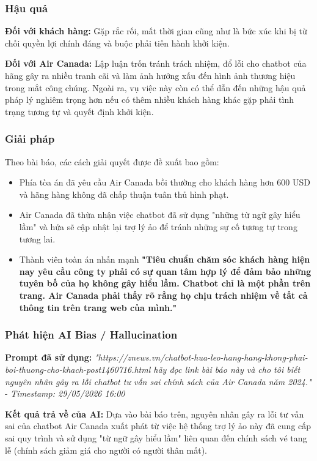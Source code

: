 \subsubsection{Hậu quả}
\textbf{Đối với khách hàng:} Gặp rắc rối, mất thời gian cũng như là bức xúc khi bị từ chối quyền lợi chính đáng và buộc phải tiến hành khởi kiện.

\textbf{Đối với Air Canada:} Lập luận trốn tránh trách nhiệm, đổ lỗi cho chatbot của hãng gây ra nhiều tranh cãi và làm ảnh hưởng xấu đến hình ảnh thương hiệu trong mắt công chúng. Ngoài ra, vụ việc này còn có thể dẫn đến những hậu quả pháp lý nghiêm trọng hơn nếu có thêm nhiều khách hàng khác gặp phải tình trạng tương tự và quyết định khởi kiện.

\subsubsection{Giải pháp}
Theo bài báo, các cách giải quyết được đề xuất bao gồm:

\begin{itemize}
    \item Phía tòa án đã yêu cầu Air Canada bồi thường cho khách hàng hơn 600 USD và hãng hàng không đã chấp thuận tuân thủ hình phạt.
    \item Air Canada đã thừa nhận việc chatbot đã sử dụng "những từ ngữ gây hiểu lầm" và hứa sẽ cập nhật lại trợ lý ảo để tránh những sự cố tương tự trong tương lai.
    \item Thành viên toàn án nhấn mạnh \textbf{"Tiêu chuẩn chăm sóc khách hàng hiện nay yêu cầu công ty phải có sự quan tâm hợp lý để đảm bảo những tuyên bố của họ không gây hiểu lầm. Chatbot chỉ là một phần trên trang. Air Canada phải thấy rõ rằng họ chịu trách nhiệm về tất cả thông tin trên trang web của mình."}
\end{itemize}

\subsubsection{Phát hiện AI Bias / Hallucination}
\textbf{Prompt đã sử dụng:} \textit{"{https://znews.vn/chatbot-hua-leo-hang-hang-khong-phai-boi-thuong-cho-khach-post1460716.html}
hãy đọc link bài báo này và cho tôi biết nguyên nhân gây ra lỗi chatbot tư vấn sai chính sách của Air Canada năm 2024."} - \textit{Timestamp: 29/05/2026 16:00}

\textbf{Kết quả trả về của AI:}
Dựa vào bài báo trên, nguyên nhân gây ra lỗi tư vấn sai của chatbot Air Canada xuất phát từ việc hệ thống trợ lý ảo này đã cung cấp sai quy trình và sử dụng "từ ngữ gây hiểu lầm" liên quan đến chính sách vé tang lễ (chính sách giảm giá cho người có người thân mất).

